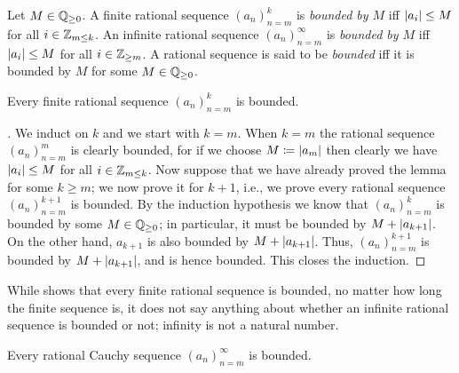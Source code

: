 \begin{defn}\label{i:5.1.12}
  Let \(M \in \mathbb{Q}_{\geq 0}\).
  A finite rational sequence \((a_n)_{n = m}^k\) is \emph{bounded by \(M\)} iff \(\left\lvert a_i\right\rvert \leq M\) for all \(i \in \mathbb{Z}_{m \leq k}\).
  An infinite rational sequence \((a_n)_{n = m}^{\infty}\) is \emph{bounded by \(M\)} iff \(\left\lvert a_i\right\rvert \leq M\) for all \(i \in \mathbb{Z}_{\geq m}\).
  A rational sequence is said to be \emph{bounded} iff it is bounded by \(M\) for some \(M \in \mathbb{Q}_{\geq 0}\).
\end{defn}

\setcounter{thm}{13}
\begin{lem}\label{i:5.1.14}
  Every finite rational sequence \((a_n)_{n = m}^k\) is bounded.
\end{lem}

\begin{proof}[]
  We induct on \(k\) and we start with \(k = m\).
  When \(k = m\) the rational sequence \((a_n)_{n = m}^m\) is clearly bounded, for if we choose \(M \coloneqq \left\lvert a_m\right\rvert\) then clearly we have \(\left\lvert a_i\right\rvert \leq M\) for all \(i \in \mathbb{Z}_{m \leq k}\).
  Now suppose that we have already proved the lemma for some \(k \geq m\);
  we now prove it for \(k + 1\), i.e., we prove every rational sequence \((a_n)_{n = m}^{k + 1}\) is bounded.
  By the induction hypothesis we know that \((a_n)_{n = m}^k\) is bounded by some \(M \in \mathbb{Q}_{\geq 0}\);
  in particular, it must be bounded by \(M + \left\lvert a_{k + 1}\right\rvert\).
  On the other hand, \(a_{k + 1}\) is also bounded by \(M + \left\lvert a_{k + 1}\right\rvert\).
  Thus, \((a_n)_{n = m}^{k + 1}\) is bounded by \(M + \left\lvert a_{k + 1}\right\rvert\), and is hence bounded.
  This closes the induction.
\end{proof}

\begin{note}
  While  shows that every finite rational sequence is bounded, no matter how long the finite sequence is, it does not say anything about whether an infinite rational sequence is bounded or not;
  infinity is not a natural number.
\end{note}

\begin{lem}\label{i:5.1.15}
  Every rational Cauchy sequence \((a_n)_{n = m}^{\infty}\) is bounded.
\end{lem}

